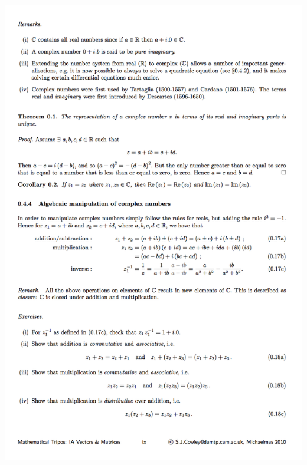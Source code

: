 \begin{mdframed}
\includegraphics[width=400pt]{img/misc--cambridge-1a-vectors-and-matrices-revision-3.png}
\end{mdframed}